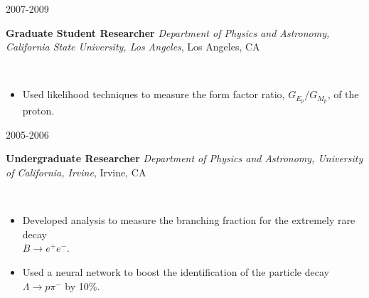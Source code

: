 \documentclass[11pt]{article}
\newcommand{\experienceentry}[5] { 
    \noindent
    \begin{minipage}[t]{0.15\textwidth} \begin{flushright} #1 \end{flushright} \end{minipage} \hspace{0.01\textwidth}
    \begin{minipage}[t]{0.84\textwidth} 
        \textbf{#2} \newline
        \emph{#3}, #4
    \end{minipage} \\[0.01pt]
    #5 \vspace{11pt}
}
\begin{document}
        \experienceentry{2007-2009}
                        {Graduate Student Researcher}
                        {Department of Physics and Astronomy, California State University, Los Angeles}
                        {Los Angeles, CA}
                        {
            \begin{itemize}[label=\textcolor{indigodye}{$\circ$}, noitemsep, nolistsep, leftmargin=0.19\textwidth]
                \item Used likelihood techniques to measure the form factor ratio, $G_{E_p}/G_{M_p}$, of
                      the proton.
            \end{itemize}
                        }  
        \experienceentry{2005-2006}
                        {Undergraduate Researcher}
                        {Department of Physics and Astronomy, University of California, Irvine}
                        {Irvine, CA}
                        { 
            \begin{itemize}[label=\textcolor{indigodye}{$\circ$}, noitemsep, nolistsep, leftmargin=0.19\textwidth]
                \item Developed analysis to measure the branching fraction for the extremely rare decay \\ 
                      $B\rightarrow e^+e^-$.
                \item Used a neural network to boost the identification of the particle decay 
                      $\Lambda \rightarrow p \pi^-$ by 10\%.
            \end{itemize}
                       } 
    
\end{document}
